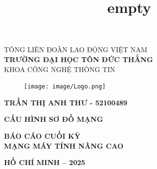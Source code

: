 \documentclass[13pt]{article}
\title{empty}
\begin{document}
	\fontsize{14pt}{20pt}\selectfont
	\begin{center}
		TÔNG LIÊN ĐOÀN LAO ĐỘNG VIỆT NAM\\\textbf{TRƯỜNG ĐẠI HỌC TÔN ĐỨC THẮNG}
        \\{KHOA CÔNG NGHỆ THÔNG TIN}\\

	\end{center}
	\vspace{1cm}
	\begin{figure}[h]
		\centering
		\texttt{[image: image/Logo.png]}
	\end{figure}
	\vspace{-1cm}
	\vspace{1cm}

\fontsize{14pt}{20pt}\selectfont
	\begin{center}
		\textbf{TRẦN THỊ ANH THƯ - 52100489 } 
        \\	
	\end{center}
    \vspace{1cm}

    
	\fontsize{24pt}{20pt}\selectfont
	\begin{center}
		\textbf{CẤU HÌNH SƠ ĐỒ MẠNG}
	\end{center}
	\vspace{1cm}
	\fontsize{22pt}{20pt}\selectfont
	\begin{center}
		\textbf{\textbf{BÁO CÁO CUỐI KỲ }\\\textbf{ MẠNG MÁY TÍNH NÂNG CAO }}	
	\end{center}
    \vspace{2cm}
	\fontsize{16pt}{20pt}\selectfont
	
	\vspace{4cm}
	\fontsize{14pt}{20pt}\selectfont
	\begin{center}
		\textbf{HỒ CHÍ MINH – 2025}
	\end{center}
\end{document}
